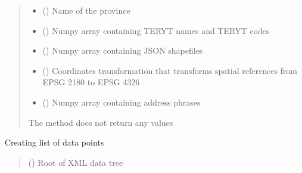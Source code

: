 \documentclass[letterpaper,10pt,english]{sphinxmanual}
\begin{document}
\begin{fulllineitems}
\begin{fulllineitems}
\begin{quote}
\begin{description}
\begin{itemize}
\item {} 
\sphinxAtStartPar
{} () \textendash{} Name of the province

\item {} 
\sphinxAtStartPar
{} () \textendash{} Numpy array containing TERYT names and TERYT codes

\item {} 
\sphinxAtStartPar
{} () \textendash{} Numpy array containing JSON shapefiles

\item {} 
\sphinxAtStartPar
{} () \textendash{} Coordinates transformation that transforms spatial references from EPSG 2180 to EPSG 4326

\item {} 
\sphinxAtStartPar
{} () \textendash{} Numpy array containing address phrases

\end{itemize}

\sphinxAtStartPar
{}

\sphinxAtStartPar
The method does not return any values

\end{description}\end{quote}

\end{fulllineitems}


\begin{fulllineitems}
\label{\detokenize{xml_parsers:xml_parsers.PRGDataParser.create_points_list}}
\pysigstartsignatures
{}
\pysigstopsignatures
\sphinxAtStartPar
Creating list of data points
\begin{quote}\begin{description}
\sphinxAtStartPar
{} () \textendash{} Root of XML data tree


\end{description}
\end{quote}
\end{fulllineitems}
\end{fulllineitems}
\end{document}
